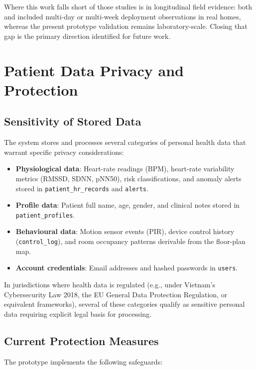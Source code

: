 Where this work falls short of those studies is in longitudinal field evidence: both
\textcite{Alam2012} and \textcite{Suryadevara2014} included multi-day or multi-week
deployment observations in real homes, whereas the present prototype validation remains
laboratory-scale. Closing that gap is the primary direction identified for future work.

\section{Patient Data Privacy and Protection}
\label{sec:privacy}

\subsection{Sensitivity of Stored Data}

The system stores and processes several categories of personal health data that
warrant specific privacy considerations:

\begin{itemize}
    \item \textbf{Physiological data}: Heart-rate readings (BPM), heart-rate variability
          metrics (RMSSD, SDNN, pNN50), risk classifications, and anomaly alerts stored
          in \texttt{patient\_hr\_records} and \texttt{alerts}.
    \item \textbf{Profile data}: Patient full name, age, gender, and clinical notes
          stored in \texttt{patient\_profiles}.
    \item \textbf{Behavioural data}: Motion sensor events (PIR), device control history
          (\texttt{control\_log}), and room occupancy patterns derivable from the floor-plan map.
    \item \textbf{Account credentials}: Email addresses and hashed passwords in
          \texttt{users}.
\end{itemize}

In jurisdictions where health data is regulated (e.g., under Vietnam's Cybersecurity Law
2018, the EU General Data Protection Regulation, or equivalent frameworks), several of
these categories qualify as sensitive personal data requiring explicit legal basis for
processing.

\subsection{Current Protection Measures}

The prototype implements the following safeguards:

